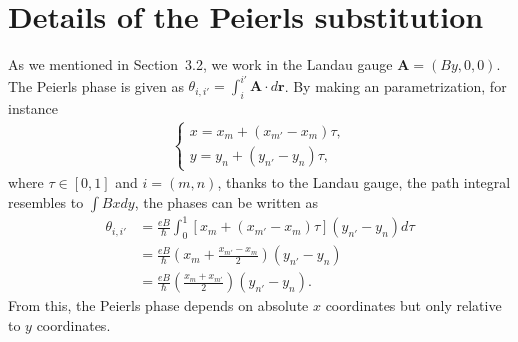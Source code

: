 \chapter{Details of the Peierls substitution} \label{appendix C}
As we mentioned in Section~3.2, we work in the Landau gauge $\mathbf{A} = (By,0,0)$. The Peierls phase is given as $\theta_{i,i'} = \int_{i}^{i'}\mathbf{A} \cdot d\mathbf{r}$. By making an parametrization, for instance
\begin{gather}
	\begin{cases}
		x = x_{m} + (x_{m'} - x_{m}) \tau, \\
		y = y_{n} + (y_{n'} - y_{n}) \tau,
	\end{cases}
\end{gather}
where $\tau \in \left[0,1\right]$ and $i = (m,n)$, thanks to the Landau gauge, the path integral resembles to $\int Bx dy$, the phases can be written as
\begin{equation}
	\begin{aligned}
		\theta_{i,i'} & = \frac{eB}{\hbar} \int_{0}^{1} \left[ x_{m} + (x_{m'} - x_{m}) \tau \right] (y_{n'} - y_{n}) d\tau \\
		& = \frac{eB}{\hbar}(x_{m} + \frac{x_{m'} - x_{m}}{2})(y_{n'} - y_{n})                                \\
		& = \frac{eB}{\hbar}\left(\frac{x_{m} + x_{m'}}{2}\right)(y_{n'} - y_{n}).
	\end{aligned}
\end{equation}
From this, the Peierls phase depends on absolute $x$ coordinates but only relative to $y$ coordinates.

